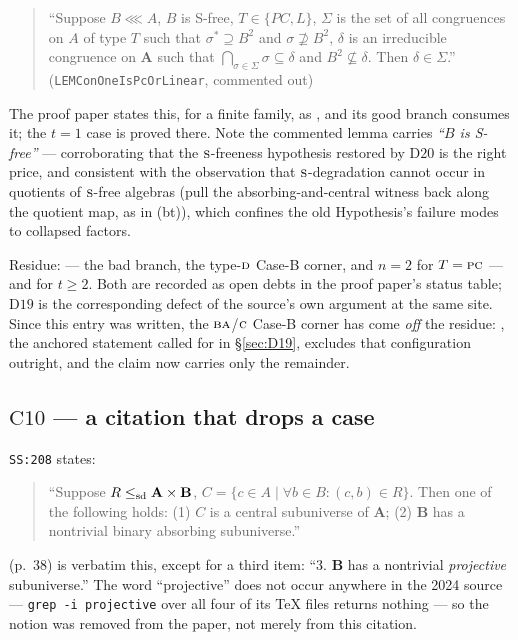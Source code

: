 \begin{entry}
\begin{quote}\small
``Suppose $B\lll A$, $B$ is S-free, $T\in\{PC,L\}$, $\Sigma$ is the set of
all congruences on $A$ of type $T$ such that $\sigma^{*}\supseteq B^{2}$ and
$\sigma\not\supseteq B^{2}$, $\delta$ is an irreducible congruence on
$\mathbf A$ such that $\bigcap_{\sigma\in\Sigma}\sigma\subseteq\delta$ and
$B^{2}\not\subseteq\delta$. Then $\delta\in\Sigma$.''
(\texttt{LEMConOneIsPcOrLinear}, commented out)
\end{quote}

The proof paper states this, for a finite family, as
, and its good branch consumes it; the $t=1$ case is
proved there. Note the commented lemma carries \emph{``$B$ is S-free''} ---
corroborating that the $\textup{\textsc{s}}$-freeness hypothesis restored by $\mathrm D20$
is the right price, and consistent with the observation that
$\textup{\textsc{s}}$-degradation cannot occur in quotients of $\textup{\textsc{s}}$-free algebras (pull the
absorbing-and-central witness back along the quotient map, as in
(bt)), which confines the old Hypothesis's failure
modes to collapsed factors.

Residue:  --- the bad branch, the type-$\textup{\textsc{d}}$
Case-B corner, and $n=2$ for $T=\textup{\textsc{pc}}$ --- and  for
$t\ge2$. Both are recorded as open debts in the proof paper's status table;
$\mathrm D19$ is the corresponding defect of the source's own argument at
the same site. Since this entry was written, the $\textup{\textsc{ba}}$/$\textup{\textsc{c}}$ Case-B
corner has come \emph{off} the residue:
, the anchored statement called for in
\S\ref{sec:D19}, excludes that configuration outright, and the claim now
carries only the remainder.
\end{entry}

\subsection{$\mathrm C{10}$ --- a citation that drops a case}\label{sec:C10}

\texttt{SS:208} states:

\begin{quote}\small
``Suppose $R\le_{\mathrm{sd}}\mathbf A\times\mathbf B$, $C=\{c\in A\mid\forall b\in B:
(c,b)\in R\}$. Then one of the following holds: (1) $C$ is a central
subuniverse of $\mathbf A$; (2) $\mathbf B$ has a nontrivial binary absorbing
subuniverse.''
\end{quote}

\cite[Thm.~6.15]{ZhukStrong} (p.~38) is verbatim this, except for a third item:
``3. $\mathbf B$ has a nontrivial \emph{projective} subuniverse.'' The word
``projective'' does not occur anywhere in the 2024 source ---
\texttt{grep -i projective} over all four of its \TeX{} files returns nothing
--- so the notion was removed from the paper, not merely from this citation.

